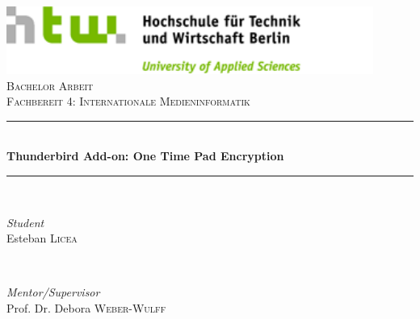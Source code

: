 \documentclass[12pt,a4paper]{article}
\begin{document}

\begin{titlepage} %
	\newcommand{\HRule}{\rule{\linewidth}{0.5mm}} %
	
	\center %
	
	
		\includegraphics[width=0.9\textwidth]{logo.png}\\[1cm] %
	
	\textsc{\Large Bachelor Arbeit}\\[0.5cm] %
	
	\textsc{\large Fachbereit 4: Internationale Medieninformatik}\\[0.5cm] %
	
	
	\HRule\\[0.4cm]
	
	{\huge\bfseries Thunderbird Add-on: One Time Pad Encryption}\\[0.4cm] %
	
	\HRule\\[1.5cm]
	
	
	\begin{minipage}{0.4\textwidth}
		\begin{flushleft}
			\large
			\textit{Student}\\
			Esteban \textsc{Licea} %
		\end{flushleft}
	\end{minipage}
	~
	\begin{minipage}{0.4\textwidth}
		\begin{flushright}
			\large
			\textit{Mentor/Supervisor}\\
			Prof. Dr. Debora \textsc{Weber-Wulff} %
		\end{flushright}
	\end{minipage}
	

\end{titlepage}
\end{document}
